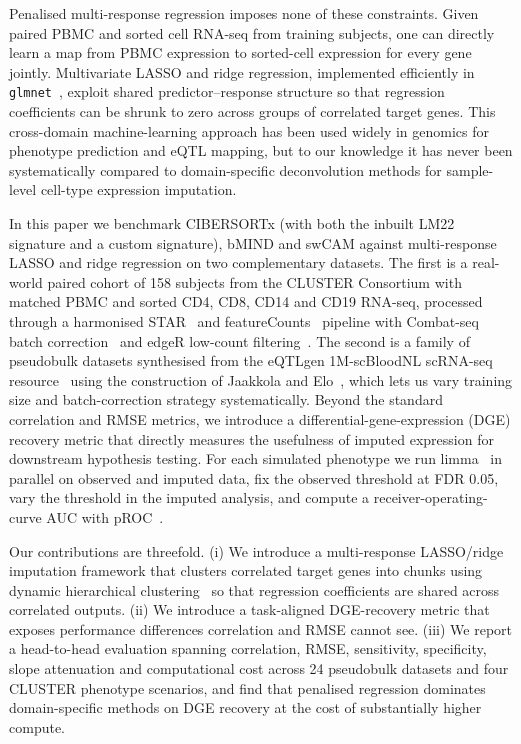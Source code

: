 \documentclass[11pt]{article}
\begin{document}
Penalised multi-response regression imposes none of these constraints.
Given paired PBMC and sorted cell RNA-seq from training subjects, one
can directly learn a map from PBMC expression to sorted-cell expression
for every gene jointly. Multivariate LASSO and ridge regression,
implemented efficiently in \texttt{glmnet}~\citep{friedman2010glmnet,
tibshirani1996lasso}, exploit shared predictor--response structure so
that regression coefficients can be shrunk to zero across groups of
correlated target genes. This cross-domain machine-learning approach
has been used widely in genomics for phenotype prediction and eQTL
mapping, but to our knowledge it has never been systematically compared
to domain-specific deconvolution methods for sample-level cell-type
expression imputation.

In this paper we benchmark CIBERSORTx (with both the inbuilt LM22
signature and a custom signature), bMIND and swCAM against
multi-response LASSO and ridge regression on two complementary
datasets. The first is a real-world paired cohort of 158 subjects from
the CLUSTER Consortium with matched PBMC and sorted CD4, CD8, CD14 and
CD19 RNA-seq, processed through a harmonised STAR~\citep{dobin2013star}
and featureCounts~\citep{liao2014featurecounts} pipeline with Combat-seq
batch correction~\citep{zhang2020combatseq} and edgeR low-count
filtering~\citep{robinson2010edger}. The second is a family of pseudobulk
datasets synthesised from the eQTLgen 1M-scBloodNL scRNA-seq
resource~\citep{oelen2022singlecell} using the construction of Jaakkola
and Elo~\citep{jaakkola2017comparison}, which lets us vary training size
and batch-correction strategy systematically. Beyond the standard
correlation and RMSE metrics, we introduce a differential-gene-expression
(DGE) recovery metric that directly measures the usefulness of imputed
expression for downstream hypothesis testing. For each simulated
phenotype we run limma~\citep{ritchie2015limma} in parallel on observed
and imputed data, fix the observed threshold at FDR 0.05, vary the
threshold in the imputed analysis, and compute a
receiver-operating-curve AUC with pROC~\citep{robin2011proc}.

Our contributions are threefold. (i) We introduce a multi-response
LASSO/ridge imputation framework that clusters correlated target genes
into chunks using dynamic hierarchical
clustering~\citep{langfelder2008dynamictreecut} so that regression
coefficients are shared across correlated outputs. (ii) We introduce a
task-aligned DGE-recovery metric that exposes performance differences
correlation and RMSE cannot see. (iii) We report a head-to-head
evaluation spanning correlation, RMSE, sensitivity, specificity, slope
attenuation and computational cost across 24 pseudobulk datasets and
four CLUSTER phenotype scenarios, and find that penalised regression
dominates domain-specific methods on DGE recovery at the cost of
substantially higher compute.
\end{document}
